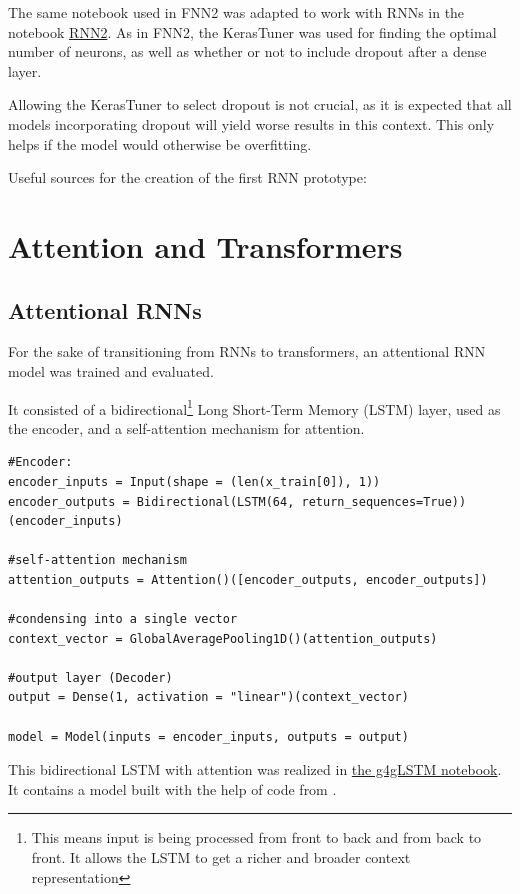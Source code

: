 \documentclass{article}
\begin{document}
The same notebook used in FNN2 was adapted to work with RNNs in the notebook \href{https://github.com/AntonStantan/matura/blob/main/RNN/RNN2.ipynb}{RNN2}. As in FNN2, the KerasTuner was used for finding the optimal number of neurons, as well as whether or not to include dropout after a dense layer.

Allowing the KerasTuner to select dropout is not crucial, as it is expected that all models incorporating dropout will yield worse results in this context. This only helps if the model would otherwise be overfitting.


Useful sources for the creation of the first RNN prototype:
\cite{bowman2015recursiveneuralnetworkslearn, tensorflow_keras_rnn, ibm_rnn}


\section{Attention and Transformers}

\subsection{Attentional RNNs}
For the sake of transitioning from RNNs to transformers, an attentional RNN model was trained and evaluated.

It consisted of a bidirectional\footnote{This means input is being processed from front to back and from back to front. It allows the LSTM to get a richer and broader context representation} Long Short-Term Memory (LSTM) layer, used as the encoder, and a self-attention mechanism for attention.

\begin{Verbatim}
#Encoder:
encoder_inputs = Input(shape = (len(x_train[0]), 1))
encoder_outputs = Bidirectional(LSTM(64, return_sequences=True))(encoder_inputs)

#self-attention mechanism
attention_outputs = Attention()([encoder_outputs, encoder_outputs])

#condensing into a single vector
context_vector = GlobalAveragePooling1D()(attention_outputs)

#output layer (Decoder)
output = Dense(1, activation = "linear")(context_vector)

model = Model(inputs = encoder_inputs, outputs = output)
\end{Verbatim}

This bidirectional LSTM with attention was realized in \href{https://github.com/AntonStantan/matura/blob/main/attentional-RNN/g4gLSTM.ipynb}{the g4gLSTM notebook}. It contains a model built with the help of code from \cite{geeksforgeeks_attention_bilstm}.
\end{document}
